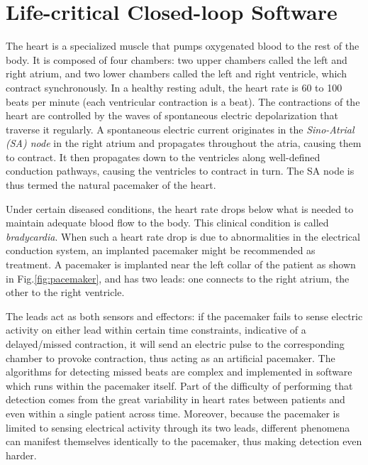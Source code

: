 \section{Life-critical Closed-loop Software}
\label{sec:eltbroad}

The heart is a specialized muscle that pumps oxygenated blood to the rest of the body.
It is composed of four chambers: two upper chambers called the left and right atrium, and two lower chambers called the left and right ventricle, which contract synchronously.
In a healthy resting adult, the heart rate is 60 to 100 beats per minute (each ventricular contraction is a beat). The contractions of the heart are controlled by the waves of spontaneous electric depolarization that traverse it regularly.
A spontaneous electric current originates in the \emph{Sino-Atrial (SA) node} in the right atrium and propagates throughout the atria, causing them to contract. 
It then propagates down to the ventricles along well-defined conduction pathways, causing the ventricles to contract in turn.
The SA node is thus termed the natural pacemaker of the heart.

Under certain diseased conditions, the heart rate drops below what is needed to maintain adequate blood flow to the body. 
This clinical condition is called \emph{bradycardia}.
When such a heart rate drop is due to abnormalities in the electrical conduction system, an implanted pacemaker might be recommended as treatment. A pacemaker is implanted near the left collar of the patient as shown in Fig.\ref{fig:pacemaker},
and has two leads: one connects to the right atrium, the other to the right ventricle. 

The leads act as both sensors and effectors: if the pacemaker fails to sense electric activity on either lead within certain time constraints, indicative of a delayed/missed contraction, it will send an electric pulse to the corresponding chamber to provoke contraction, thus acting as an artificial pacemaker.
The algorithms for detecting missed beats are complex and implemented in software which runs within the pacemaker itself. 
Part of the difficulty of performing that detection comes from the great variability in heart rates between patients and even within a single patient across time.
Moreover, because the pacemaker is limited to sensing electrical activity through its two leads, different phenomena can manifest themselves identically to the pacemaker, thus making detection even harder.

